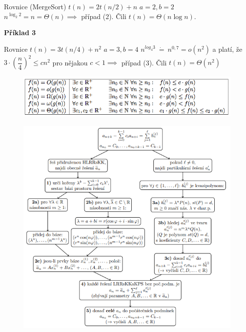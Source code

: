 \documentclass{szzclass}
\begin{document}
Rovnice (MergeSort) $t(n) = 2t(n/2) + n$\newline
$a = 2, b = 2$\newline
$n^{\log_2 2} = n = \Theta(n) \implies$ případ (2).\newline
Čili $t(n) = \Theta(n \log n)$.

\textbf{Příklad 3}

Rovnice $t(n) = 3t(n/4) + n^2$\newline
$a = 3, b = 4$\newline
$n^{log_4 3}~\dot{=}~n^{0,7} = o(n^2)$ a platí, že $3 \cdot (\dfrac{n}{4})^2 \leq cn^2$ pro
nějakou $c < 1 \implies$ případ (3).\newline
Čili $t(n) = Θ(n^2)$




\begin{figure}[h]
    \includegraphics[width=\textwidth, center]{topics/bi-spol-32/images/slozitost.png}
\end{figure}


\begin{figure}[h]
    \includegraphics[width=1\textwidth, center]{topics/bi-spol-32/images/kuchar.PNG}
\end{figure}
    
\end{document}
